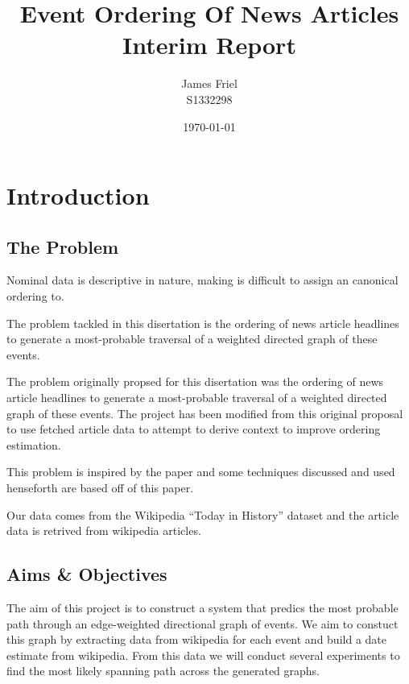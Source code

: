 \documentclass[12pt]{report}
\begin{document}
\title{Event Ordering Of News Articles \\ Interim Report}
\author{
        James Friel \\
                S1332298\\
}
\date{\today}


\maketitle

\tableofcontents

\chapter{Introduction}
        \section{The Problem}
        Nominal data is descriptive in nature, making is difficult to assign an canonical ordering to.
        
        The problem tackled in this disertation is the ordering of news article headlines to generate
        a most-probable traversal of a weighted directed graph of these events.

        The problem originally propsed for this disertation was the ordering of news article headlines
        to generate a most-probable traversal of a weighted directed graph of these events. The project
        has been modified from this original proposal to use fetched article data to attempt to derive
        context to improve ordering estimation.

        This problem is inspired by the paper \cite{abend2015lexical} and some
        techniques discussed and used henseforth are based off of this paper.


        Our data comes from the Wikipedia ``Today in History'' dataset and the article data is retrived
        from wikipedia articles.

        \section{Aims \& Objectives}
        The aim of this project is to construct a system that predics the most probable path
        through an edge-weighted directional graph of events.
        We aim to constuct this graph by extracting data from wikipedia for each event and
        build a date estimate from wikipedia. From this data we will conduct several experiments
        to find the most likely spanning path across the generated graphs.
\end{document}
